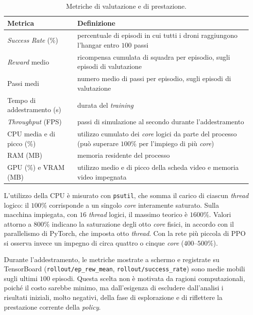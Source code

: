 \documentclass[12pt,a4paper,twoside]{report}
\newcommand{\fonte}[1][elaborazione propria]{\par\vspace{3pt}{\footnotesize\emph{Fonte: #1.}}}
\begin{document}
\begin{table}[htbp]
    \centering
    \begin{tabularx}{\textwidth}{l X}
        \toprule
        \textbf{Metrica} & \textbf{Definizione} \\
        \midrule
        \emph{Success Rate} (\%)   & percentuale di episodi in cui tutti i droni raggiungono l'hangar entro $100$ passi \\
        \emph{Reward} medio        & ricompensa cumulata di squadra per episodio, sugli episodi di valutazione \\
        Passi medi                 & numero medio di passi per episodio, sugli episodi di valutazione \\
        Tempo di addestramento (s) & durata del \emph{training} \\
        \emph{Throughput} (FPS)    & passi di simulazione al secondo durante l'addestramento \\
        CPU media e di picco (\%)  & utilizzo cumulato dei \emph{core} logici da parte del processo (può superare $100\%$ per l'impiego di più \emph{core}) \\
        RAM (MB)                   & memoria residente del processo \\
        GPU (\%) e VRAM (MB)       & utilizzo medio e di picco della scheda video e memoria video impegnata \\
        \bottomrule
    \end{tabularx}
    \caption{Metriche di valutazione e di prestazione.}
    \label{tab:5_2}
    \fonte
\end{table}

L'utilizzo della CPU è misurato con \texttt{psutil}, che somma il carico di ciascun \emph{thread} logico: il $100\%$ corrisponde a un singolo \emph{core} interamente saturato. Sulla macchina impiegata, con $16$ \emph{thread} logici, il massimo teorico è $1600\%$. Valori attorno a $800\%$ indicano la saturazione degli otto \emph{core} fisici, in accordo con il parallelismo di PyTorch, che imposta otto \emph{thread}. Con la rete più piccola di PPO si osserva invece un impegno di circa quattro o cinque \emph{core} ($400$--$500\%$).

Durante l'addestramento, le metriche mostrate a schermo e registrate su TensorBoard (\texttt{rollout/ep\_rew\_mean}, \texttt{rollout/success\_rate}) sono medie mobili sugli ultimi $100$ episodi. Questa scelta non è motivata da ragioni computazionali, poiché il costo sarebbe minimo, ma dall'esigenza di escludere dall'analisi i risultati iniziali, molto negativi, della fase di esplorazione e di riflettere la prestazione corrente della \emph{policy}.
\end{document}
